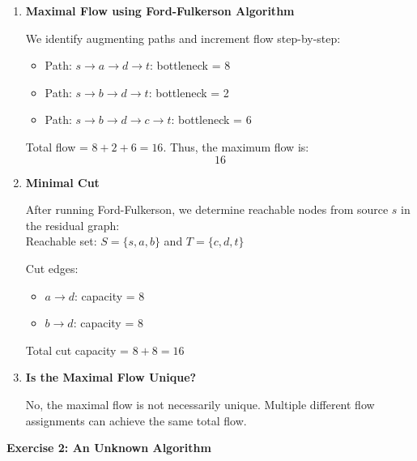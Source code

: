 \documentclass{article}
\theoremstyle{theorem}
\theoremstyle{definition}
\theoremstyle{remark}
\begin{document}
\begin{enumerate}
    \item \textbf{Maximal Flow using Ford-Fulkerson Algorithm}

    We identify augmenting paths and increment flow step-by-step:

    \begin{itemize}
        \item Path: \( s \rightarrow a \rightarrow d \rightarrow t \): bottleneck = 8
        \item Path: \( s \rightarrow b \rightarrow d \rightarrow t \): bottleneck = 2
        \item Path: \( s \rightarrow b \rightarrow d \rightarrow c \rightarrow t \): bottleneck = 6
    \end{itemize}

    Total flow = \( 8 + 2 + 6 = 16 \). Thus, the maximum flow is:
    \[
    \boxed{16}
    \]

    \item \textbf{Minimal Cut}

    After running Ford-Fulkerson, we determine reachable nodes from source \( s \) in the residual graph: \\
    Reachable set: \( S = \{s, a, b\} \) \quad and \quad \( T = \{c, d, t\} \)

    Cut edges:
    \begin{itemize}
        \item \( a \rightarrow d \): capacity = 8
        \item \( b \rightarrow d \): capacity = 8
    \end{itemize}

    Total cut capacity = \( 8 + 8 = \boxed{16} \)

    \item \textbf{Is the Maximal Flow Unique?}

    No, the maximal flow is not necessarily unique. Multiple different flow assignments can achieve the same total flow.
\end{enumerate}


\textbf{Exercise 2: An Unknown Algorithm}
\end{document}
